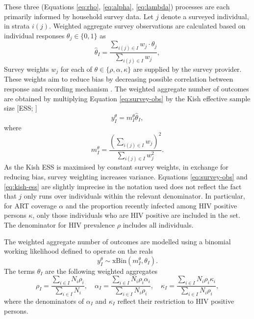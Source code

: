 \documentclass[a4paper, nobind]{templates/ociamthesis}
\begin{document}
These three (Equations \eqref{eq:rho}, \eqref{eq:alpha}, \eqref{eq:lambda}) processes are each primarily informed by household survey data.
Let \(j\) denote a surveyed individual, in strata \(i(j)\).
Weighted aggregate survey observations are calculated based on individual responses \(\theta_j \in \{0, 1\}\) as
\begin{equation}
\hat \theta_I = \frac{\sum_{i(j) \in I} w_j \cdot\theta_j}{\sum_{i(j) \in I} w_j}, \label{eq:survey-obs}
\end{equation}
Survey weights \(w_j\) for each of \(\theta \in \{\rho, \alpha, \kappa\}\) are supplied by the survey provider.
These weights aim to reduce bias by decreasing possible correlation between response and recording mechanism \autocite{meng2018statistical}.
The weighted aggregate number of outcomes are obtained by multiplying Equation \eqref{eq:survey-obs} by the Kish effective sample size {[}ESS; \textcite{kish1965survey}{]}
\begin{equation}
y^{\theta}_{I} = m^{\theta}_{I} \hat \theta_{I}, \label{eq:weighted-aggregate}
\end{equation}
where
\begin{equation}
m^{\theta}_I = \frac{\left(\sum_{i(j) \in I} w_j\right)^2}{\sum_{i(j) \in I} w_j^2}. \label{eq:kish-ess}
\end{equation}
As the Kish ESS is maximised by constant survey weights, in exchange for reducing bias, survey weighting increases variance.
Equations \eqref{eq:survey-obs} and \eqref{eq:kish-ess} are slightly imprecise in the notation used does not reflect the fact that \(j\) only runs over individuals within the relevant denominator.
In particular, for ART coverage \(\alpha\) and the proportion recently infected among HIV positive persons \(\kappa\), only those individuals who are HIV positive are included in the set.
The denominator for HIV prevalence \(\rho\) includes all individuals.

The weighted aggregate number of outcomes are modelled using a binomial working likelihood \autocite{chen2014use} defined to operate on the reals
\begin{equation}
y^{\theta}_{I} \sim \text{xBin}(m^{\theta}_{I}, \theta_{I}). \label{eq:xbin}
\end{equation}
The terms \(\theta_{I}\) are the following weighted aggregates
\begin{equation}
\rho_{I} = \frac{\sum_{i \in I} N_i \rho_i}{\sum_{i \in I} N_i}, \quad
\alpha_{I} = \frac{\sum_{i \in I} N_i \rho_i \alpha_i}{\sum_{i \in I} N_i \rho_i}, \quad
\kappa_{I} = \frac{\sum_{i \in I} N_i \rho_i \kappa_i}{\sum_{i \in I} N_i \rho_i}, \label{eq:weighted-aggregates}
\end{equation}
where the denominators of \(\alpha_{I}\) and \(\kappa_{I}\) reflect their restriction to HIV positive persons.
\end{document}
